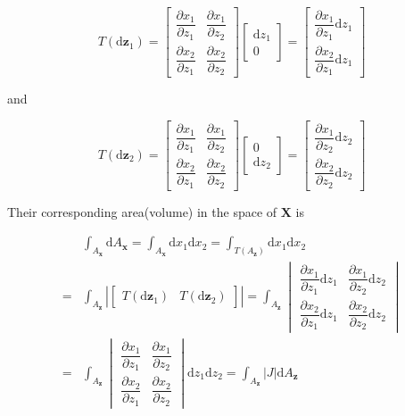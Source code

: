 \documentclass[
]{book}
\theoremstyle{definition}
\theoremstyle{definition}
\theoremstyle{definition}
\theoremstyle{definition}
\theoremstyle{remark}
\begin{document}
\[
T\left(\mathrm{d}\boldsymbol{z}_{1}\right)=\begin{bmatrix}\dfrac{\partial x_{1}}{\partial z_{1}} & \dfrac{\partial x_{1}}{\partial z_{2}}\\
\dfrac{\partial x_{2}}{\partial z_{1}} & \dfrac{\partial x_{2}}{\partial z_{2}}
\end{bmatrix}\begin{bmatrix}\mathrm{d}z_{1}\\
0
\end{bmatrix}=\begin{bmatrix}\dfrac{\partial x_{1}}{\partial z_{1}}\mathrm{d}z_{1}\\
\dfrac{\partial x_{2}}{\partial z_{1}}\mathrm{d}z_{1}
\end{bmatrix}
\]

and

\[
T\left(\mathrm{d}\boldsymbol{z}_{2}\right)=\begin{bmatrix}\dfrac{\partial x_{1}}{\partial z_{1}} & \dfrac{\partial x_{1}}{\partial z_{2}}\\
\dfrac{\partial x_{2}}{\partial z_{1}} & \dfrac{\partial x_{2}}{\partial z_{2}}
\end{bmatrix}\begin{bmatrix}0\\
\mathrm{d}z_{2}
\end{bmatrix}=\begin{bmatrix}\dfrac{\partial x_{1}}{\partial z_{2}}\mathrm{d}z_{2}\\
\dfrac{\partial x_{2}}{\partial z_{2}}\mathrm{d}z_{2}
\end{bmatrix}
\]

Their corresponding area(volume) in the space of \(\boldsymbol{X}\) is

\[
\begin{aligned}
 & \int_{A_{\boldsymbol{x}}}\mathrm{d}A_{\boldsymbol{x}}=\int_{A_{\boldsymbol{x}}}\mathrm{d}x_{1}\mathrm{d}x_{2}=\int_{T\left(A_{\boldsymbol{z}}\right)}\mathrm{d}x_{1}\mathrm{d}x_{2}\\
= & \int_{A_{\boldsymbol{z}}}\left|\begin{bmatrix}T\left(\mathrm{d}\boldsymbol{z}_{1}\right) & T\left(\mathrm{d}\boldsymbol{z}_{2}\right)\end{bmatrix}\right|=\int_{A_{\boldsymbol{z}}}\begin{vmatrix}\dfrac{\partial x_{1}}{\partial z_{1}}\mathrm{d}z_{1} & \dfrac{\partial x_{1}}{\partial z_{2}}\mathrm{d}z_{2}\\
\dfrac{\partial x_{2}}{\partial z_{1}}\mathrm{d}z_{1} & \dfrac{\partial x_{2}}{\partial z_{2}}\mathrm{d}z_{2}
\end{vmatrix}\\
= & \int_{A_{\boldsymbol{z}}}\begin{vmatrix}\dfrac{\partial x_{1}}{\partial z_{1}} & \dfrac{\partial x_{1}}{\partial z_{2}}\\
\dfrac{\partial x_{2}}{\partial z_{1}} & \dfrac{\partial x_{2}}{\partial z_{2}}
\end{vmatrix}\mathrm{d}z_{1}\mathrm{d}z_{2}=\int_{A_{\boldsymbol{z}}}\left|J\right|\mathrm{d}A_{\boldsymbol{z}}
\end{aligned}
\]
\end{document}
